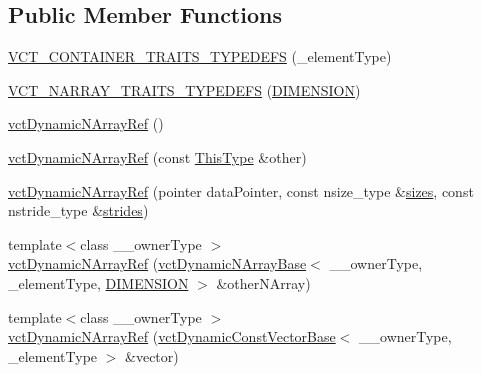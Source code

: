 \subsection*{Public Member Functions}
\begin{DoxyCompactItemize}
\item 
\hyperlink{classvct_dynamic_n_array_ref_ad2da5cb95e277dfa7a702f1f25a0763d}{V\+C\+T\+\_\+\+C\+O\+N\+T\+A\+I\+N\+E\+R\+\_\+\+T\+R\+A\+I\+T\+S\+\_\+\+T\+Y\+P\+E\+D\+E\+F\+S} (\+\_\+element\+Type)
\item 
\hyperlink{classvct_dynamic_n_array_ref_ab95c858c7e624778f49fcd50a59fcfa9}{V\+C\+T\+\_\+\+N\+A\+R\+R\+A\+Y\+\_\+\+T\+R\+A\+I\+T\+S\+\_\+\+T\+Y\+P\+E\+D\+E\+F\+S} (\hyperlink{group__cisst_vector_gga92161a3e7a42576d3442eaf7bae097c1aa639cdab72a595c9cb324af98946bab5}{D\+I\+M\+E\+N\+S\+I\+O\+N})
\item 
\hyperlink{classvct_dynamic_n_array_ref_a2466569633dabf250c3b8a05ada50f97}{vct\+Dynamic\+N\+Array\+Ref} ()
\item 
\hyperlink{classvct_dynamic_n_array_ref_abecd30d0c81e3b4376bd7a5eec25ecfe}{vct\+Dynamic\+N\+Array\+Ref} (const \hyperlink{classvct_dynamic_n_array_ref_a157266ffe0ad737f4df13dcf499a4494}{This\+Type} \&other)
\item 
\hyperlink{classvct_dynamic_n_array_ref_a05a3c06ced792e3c0cbb4b6c07752063}{vct\+Dynamic\+N\+Array\+Ref} (pointer data\+Pointer, const nsize\+\_\+type \&\hyperlink{classvct_dynamic_const_n_array_base_aa86793343d80325ba5671bc24a2e0e8f}{sizes}, const nstride\+\_\+type \&\hyperlink{classvct_dynamic_const_n_array_base_a6608baee60a448ccb9598417c487cde2}{strides})
\item 
{\footnotesize template$<$class \+\_\+\+\_\+owner\+Type $>$ }\\\hyperlink{classvct_dynamic_n_array_ref_a8654ce059ffe4e87e449150758dec1e3}{vct\+Dynamic\+N\+Array\+Ref} (\hyperlink{classvct_dynamic_n_array_base}{vct\+Dynamic\+N\+Array\+Base}$<$ \+\_\+\+\_\+owner\+Type, \+\_\+element\+Type, \hyperlink{group__cisst_vector_gga92161a3e7a42576d3442eaf7bae097c1aa639cdab72a595c9cb324af98946bab5}{D\+I\+M\+E\+N\+S\+I\+O\+N} $>$ \&other\+N\+Array)
\item 
{\footnotesize template$<$class \+\_\+\+\_\+owner\+Type $>$ }\\\hyperlink{classvct_dynamic_n_array_ref_a0331ff18df812b9d206c94207368258a}{vct\+Dynamic\+N\+Array\+Ref} (\hyperlink{classvct_dynamic_const_vector_base}{vct\+Dynamic\+Const\+Vector\+Base}$<$ \+\_\+\+\_\+owner\+Type, \+\_\+element\+Type $>$ \&vector)
\item 

\end{DoxyCompactItemize}
